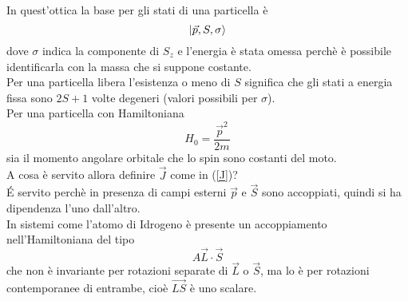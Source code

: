 \documentclass[twoside]{article}
\begin{document}
In quest'ottica la base per gli stati di una particella è
\begin{equation}
    \ket{\Vec{p},S,\sigma}
\end{equation}
dove $\sigma$ indica la componente di $S_z$ e l'energia è stata omessa perchè è possibile identificarla con la massa che si suppone costante.
\\
Per una particella libera l'esistenza o meno di $S$ significa che gli stati a energia fissa sono $2S+1$ volte degeneri (valori possibili per $\sigma$).
\\
Per una particella con Hamiltoniana
\begin{equation}
    H_0=\frac{\Vec{p}^2}{2m}
\end{equation}
sia il momento angolare orbitale che lo spin sono costanti del moto.
\\
A cosa è servito allora definire $\Vec{J}$ come in (\ref{J})?
\\
\'E servito perchè in presenza di campi esterni $\Vec{p}$ e $\Vec{S}$ sono accoppiati, quindi si ha dipendenza l'uno dall'altro.
\\
In sistemi come l'atomo di Idrogeno è presente un accoppiamento nell'Hamiltoniana del tipo
\begin{equation}
    A\Vec{L}\cdot \Vec{S}
\end{equation}
che non è invariante per rotazioni separate di $\Vec{L}$ o $\Vec{S}$, ma lo è per rotazioni contemporanee di entrambe, cioè $\Vec{LS}$ è uno scalare.

\vspace{0.5cm}
\end{document}
